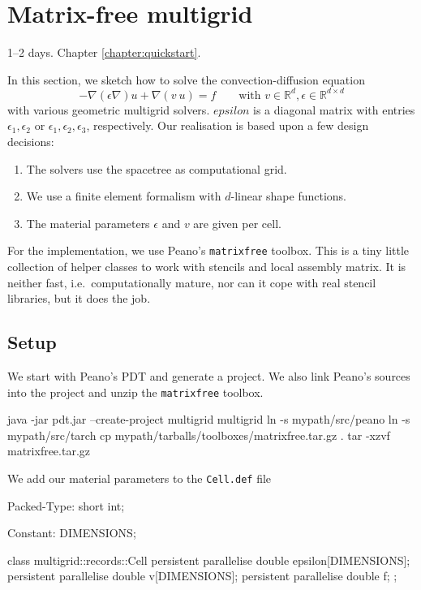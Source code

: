 \section{Matrix-free multigrid}
  \label{section:applications:matrix-free-multigrid}

\chapterDescription
  {
    1--2 days.
  }
  {
    Chapter \ref{chapter:quickstart}.
  }

In this section, we sketch how to solve the convection-diffusion equation
\[
  - \nabla (\epsilon \nabla) u + \nabla (v\ u) = f \qquad \mbox{with } v \in
  \mathbb{R}^d, \epsilon \in \mathbb{R}^{d \times d}
\]
with various geometric multigrid solvers. $epsilon$ is a diagonal matrix with
entries $\epsilon _1, \epsilon _2$ or $\epsilon _1, \epsilon _2, \epsilon _3$,
respectively.
Our realisation is based upon a few design decisions:

\begin{enumerate}
  \item The solvers use the spacetree as computational grid.
  \item We use a finite element formalism with $d$-linear shape functions.
  \item The material parameters $\epsilon $ and $v$ are given per cell.
\end{enumerate}


\noindent
For the implementation, we use Peano's \texttt{matrixfree} toolbox. 
This is a tiny little collection of helper classes to work with stencils and
local assembly matrix. 
It is neither fast, i.e.~computationally mature, nor can it cope with real
stencil libraries, but it does the job.



\subsection{Setup}

We start with Peano's PDT and generate a project. We also link Peano's sources
into the project and unzip the \texttt{matrixfree} toolbox. 
\begin{code}
  java -jar pdt.jar --create-project multigrid multigrid
  ln -s mypath/src/peano 
  ln -s mypath/src/tarch
  cp mypath/tarballs/toolboxes/matrixfree.tar.gz .
  tar -xzvf matrixfree.tar.gz
\end{code}


\noindent
We add our material parameters to the \texttt{Cell.def} file
\begin{code}
Packed-Type: short int;

Constant: DIMENSIONS;

class multigrid::records::Cell {  
  persistent parallelise double   epsilon[DIMENSIONS];
  persistent parallelise double   v[DIMENSIONS];
  persistent parallelise double   f;
};
\end{code}

